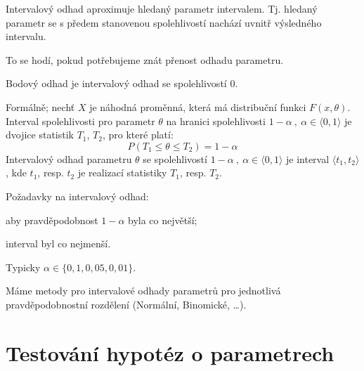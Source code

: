 \begin{compactitem}
    \item Intervalový odhad aproximuje hledaný parametr intervalem. Tj. hledaný parametr se s předem stanovenou spolehlivostí nachází uvnitř výsledného intervalu. \begin{compactitem}
        \item To se hodí, pokud potřebujeme znát přenost odhadu parametru.
        \item Bodový odhad je intervalový odhad se spolehlivostí 0.
    \end{compactitem}

    \item Formálně; nechť $X$ je náhodná proměnná, která má distribuční funkci $F( x, \theta)$. Interval spolehlivosti pro parametr $\theta$ na hranici spolehlivosti $1 - \alpha ~,~ \alpha \in \langle 0, 1 \rangle$ je dvojice statistik $T_1$, $T_2$, pro které platí:
    $$ P(T_1 \leq \theta \leq T_2) = 1 - \alpha $$
    Intervalový odhad parametru $\theta$ se spolehlivostí $1 - \alpha ~,~ \alpha \in \langle 0, 1 \rangle$ je interval $\langle t_1, t_2 \rangle$, kde $t_1$, resp. $t_2$ je realizací statistiky $T_1$, resp. $T_2$.

    \item Požadavky na intervalový odhad: \begin{compactitem}
        \item aby pravděpodobnost $1 - \alpha$ byla co největší;
        \item interval byl co nejmenší.
        \item Typicky $\alpha \in \{ 0,1, 0,05, 0,01 \}$.
    \end{compactitem}

    \item Máme metody pro intervalové odhady parametrů pro jednotlivá pravděpodobnostní rozdělení (Normální, Binomické, \dots).
\end{compactitem}


\section{Testování hypotéz o parametrech}

